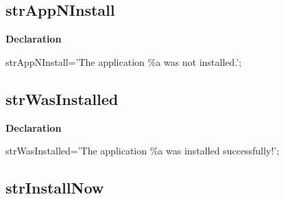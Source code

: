 \documentclass{report}
\newif\ifpdf
\begin{document}
\subsection*{strAppNInstall}
\fi
\label{trstrings-strAppNInstall}
\begin{list}{}{
\setlength{\itemindent}{0cm}
\setlength{\listparindent}{0cm}
\setlength{\leftmargin}{\evensidemargin}
\addtolength{\leftmargin}{\tmplength}
\settowidth{\labelsep}{X}
\addtolength{\leftmargin}{\labelsep}
\setlength{\labelwidth}{\tmplength}
}
\item[\textbf{Declaration}\hfill]
\ifpdf
\begin{flushleft}
\fi
\begin{ttfamily}
strAppNInstall='The application {\%}a was not installed.';\end{ttfamily}

\ifpdf
\end{flushleft}
\fi

\end{list}
\ifpdf
\subsection*{\large{\textbf{strWasInstalled}}\normalsize\hspace{1ex}\hrulefill}
\else
\subsection*{strWasInstalled}
\fi
\label{trstrings-strWasInstalled}
\begin{list}{}{
\setlength{\itemindent}{0cm}
\setlength{\listparindent}{0cm}
\setlength{\leftmargin}{\evensidemargin}
\addtolength{\leftmargin}{\tmplength}
\settowidth{\labelsep}{X}
\addtolength{\leftmargin}{\labelsep}
\setlength{\labelwidth}{\tmplength}
}
\item[\textbf{Declaration}\hfill]
\ifpdf
\begin{flushleft}
\fi
\begin{ttfamily}
strWasInstalled='The application {\%}a was installed successfully!';\end{ttfamily}

\ifpdf
\end{flushleft}
\fi

\end{list}
\ifpdf
\subsection*{\large{\textbf{strInstallNow}}\normalsize\hspace{1ex}\hrulefill}
\else
\end{document}
